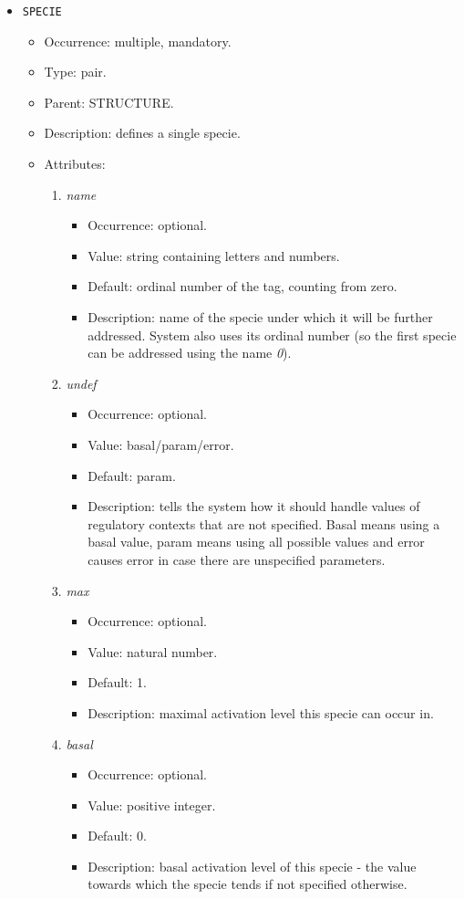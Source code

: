 \documentclass[12pt]{article}
\newenvironment{menum}{
\begin{enumerate}
  \setlength{\itemsep}{0pt}
  \setlength{\parskip}{0pt}
  \setlength{\parsep}{0pt}
}{\end{enumerate}}
\newenvironment{mitem}{
\begin{itemize}
  \setlength{\itemsep}{0pt}
  \setlength{\parskip}{0pt}
  \setlength{\parsep}{0pt}
}{\end{itemize}}
\begin{document}
\begin{mitem}
	\item \texttt{SPECIE}
	\begin{mitem}
		\item Occurrence: multiple, mandatory.
		\item Type: pair.
		\item Parent: STRUCTURE.
		\item Description: defines a single specie.
		\item Attributes:	
		\begin{menum}
			\item \textit{name} 
			\begin{mitem}
				\item Occurrence: optional.
				\item Value: string containing letters and numbers.
				\item Default: ordinal number of the tag, counting from zero.
				\item Description: name of the specie under which it will be further addressed. System also uses its ordinal number (so the first specie can be addressed using the name \emph{0}).
			\end{mitem}
			\item \textit{undef} 
			\begin{mitem}
				\item Occurrence: optional.
				\item Value: basal/param/error.
				\item Default: param.
				\item Description: tells the system how it should handle values of regulatory contexts that are not specified. Basal means using a basal value, param means using all possible values and error causes error in case there are unspecified parameters.
			\end{mitem}
			\item \textit{max} 
			\begin{mitem}
				\item Occurrence: optional.
				\item Value: natural number.
				\item Default: 1.
				\item Description: maximal activation level this specie can occur in.
			\end{mitem}
			\item \textit{basal} 
			\begin{mitem}
				\item Occurrence: optional.
				\item Value: positive integer.
				\item Default: 0.
				\item Description: basal activation level of this specie - the value towards which the specie tends if not specified otherwise.
			\end{mitem}
		\end{menum}
	\end{mitem}
\end{mitem}
\end{document}

